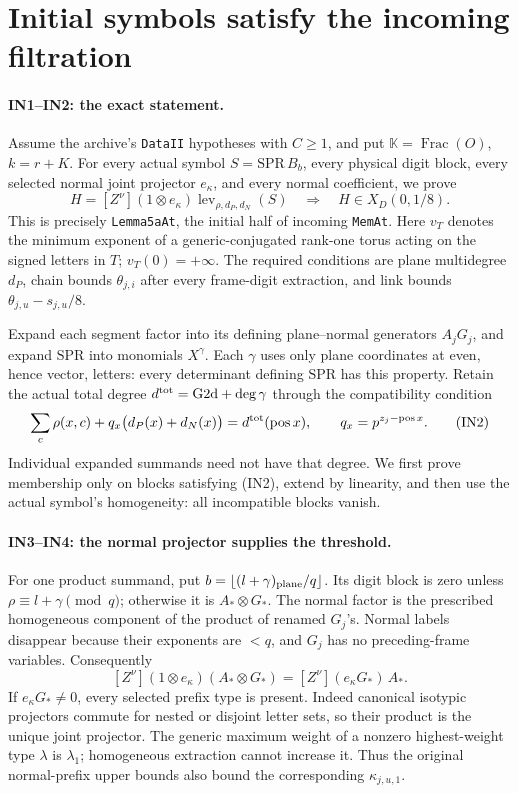 \section{Initial symbols satisfy the incoming filtration}
\label{sec:initial-membership}

\paragraph{IN1--IN2: the exact statement.}
Assume the archive's \texttt{DataII} hypotheses with $C\geq1$, and put
$\mathbb K=\operatorname{Frac}(O)$, $k=r+K$.  For every actual symbol
$S=\mathrm{SPR}\,B_b$, every physical digit block, every selected normal
joint projector $e_\kappa$, and every normal coefficient, we prove
\[
 H=[Z^\nu](1\otimes e_\kappa)\operatorname{lev}_{\rho,d_P,d_N}(S)
 \quad\Longrightarrow\quad H\in X_D(0,1/8).
 \tag{IN1}
\]
This is precisely \texttt{Lemma5aAt}, the initial half of incoming
\texttt{MemAt}.  Here $v_T$ denotes the minimum exponent of a
generic-conjugated rank-one torus acting on the signed letters in $T$;
$v_T(0)=+\infty$.  The required conditions are plane multidegree $d_P$,
chain bounds $\theta_{j,i}$ after every frame-digit extraction, and link
bounds $\theta_{j,u}-s_{j,u}/8$.

Expand each segment factor into its defining plane--normal generators
$A_jG_j$, and expand $\mathrm{SPR}$ into monomials $X^\gamma$.
Each $\gamma$ uses only plane coordinates at even, hence vector, letters:
every determinant defining $\mathrm{SPR}$ has this property.
Retain the actual total degree
$d^{\rm tot}=\mathrm{G2d}+\deg\gamma$ through the compatibility condition
\[
 \sum_c\rho(x,c)+q_x\bigl(d_P(x)+d_N(x)\bigr)
       =d^{\rm tot}(\operatorname{pos}x),
 \qquad q_x=p^{z_j-\operatorname{pos}x}.
 \tag{IN2}
\]
Individual expanded summands need not have that degree.  We first prove
membership only on blocks satisfying (IN2), extend by linearity, and
then use the actual symbol's homogeneity: all incompatible blocks vanish.

\paragraph{IN3--IN4: the normal projector supplies the threshold.}
For one product summand, put $b=\lfloor(l+\gamma)_{\rm plane}/q\rfloor$.
Its digit block is zero unless $\rho\equiv l+\gamma\pmod q$; otherwise it is
$A_*\otimes G_*$.  The normal factor is the prescribed homogeneous
component of the product of renamed $G_j$'s.  Normal labels disappear
because their exponents are $<q$, and $G_j$ has no preceding-frame variables.
Consequently
\[
 [Z^\nu](1\otimes e_\kappa)(A_*\otimes G_*)
             =[Z^\nu](e_\kappa G_*)\,A_*.
 \tag{IN3}
\]
If $e_\kappa G_*\neq0$, every selected prefix type is present.
Indeed canonical isotypic projectors commute for nested or disjoint
letter sets, so their product is the unique joint projector.
The generic maximum weight of a nonzero highest-weight type $\lambda$
is $\lambda_1$; homogeneous extraction cannot increase it.
Thus the original normal-prefix upper bounds also bound the corresponding
$\kappa_{j,u,1}$.

